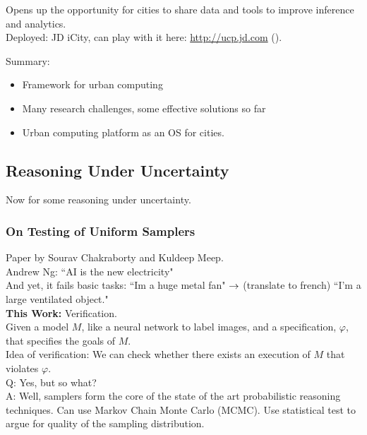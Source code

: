 Opens up the opportunity for cities to share data and tools to improve inference and analytics. \\

Deployed: JD iCity, can play with it here: \url{http://ucp.jd.com} ().

Summary:
\begin{itemize}
    \item Framework for urban computing
    \item Many research challenges, some effective solutions so far
    \item Urban computing platform as an OS for cities.
\end{itemize}

\spacerule

\subsection{Reasoning Under Uncertainty}

Now for some reasoning under uncertainty.


\subsubsection{On Testing of Uniform Samplers~\cite{chakraborty2019testing}}

Paper by Sourav Chakraborty and Kuldeep Meep. \\

Andrew Ng: ``AI is the new electricity" \\

And yet, it fails basic tasks: ``Im a huge metal fan" $\rightarrow$ (translate to french) ``I'm a large ventilated object." \\

{\bf This Work:} Verification. \\

Given a model $M$, like a neural network to label images, and a specification, $\varphi$, that specifies the goals of $M$. \\

Idea of verification: We can check whether there exists an execution of $M$ that violates $\varphi$.\\

Q: Yes, but so what? \\

A: Well, samplers form the core of the state of the art probabilistic reasoning techniques. Can use Markov Chain Monte Carlo (MCMC). Use statistical test to argue for quality of the sampling distribution. \\

